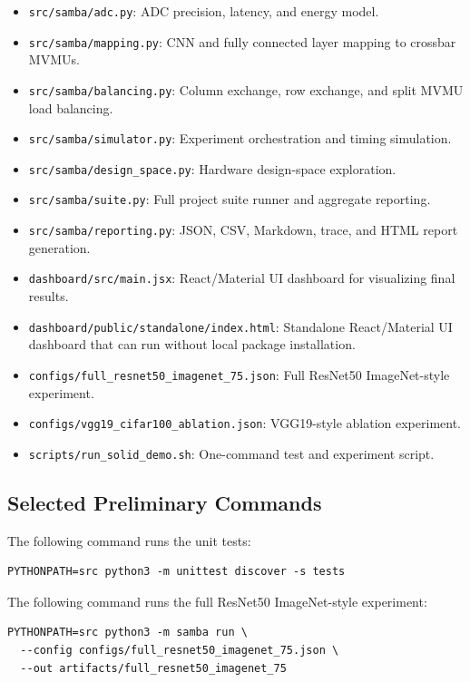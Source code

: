 \documentclass[11pt]{article}
\begin{document}
\begin{itemize}
    \item \texttt{src/samba/adc.py}: ADC precision, latency, and energy model.
    \item \texttt{src/samba/mapping.py}: CNN and fully connected layer mapping to crossbar MVMUs.
    \item \texttt{src/samba/balancing.py}: Column exchange, row exchange, and split MVMU load balancing.
    \item \texttt{src/samba/simulator.py}: Experiment orchestration and timing simulation.
    \item \texttt{src/samba/design\_space.py}: Hardware design-space exploration.
    \item \texttt{src/samba/suite.py}: Full project suite runner and aggregate reporting.
    \item \texttt{src/samba/reporting.py}: JSON, CSV, Markdown, trace, and HTML report generation.
    \item \texttt{dashboard/src/main.jsx}: React/Material UI dashboard for visualizing final results.
    \item \texttt{dashboard/public/standalone/index.html}: Standalone React/Material UI dashboard that can run without local package installation.
    \item \texttt{configs/full\_resnet50\_imagenet\_75.json}: Full ResNet50 ImageNet-style experiment.
    \item \texttt{configs/vgg19\_cifar100\_ablation.json}: VGG19-style ablation experiment.
    \item \texttt{scripts/run\_solid\_demo.sh}: One-command test and experiment script.
\end{itemize}

\subsection{Selected Preliminary Commands}

The following command runs the unit tests:

\begin{lstlisting}
PYTHONPATH=src python3 -m unittest discover -s tests
\end{lstlisting}

The following command runs the full ResNet50 ImageNet-style experiment:

\begin{lstlisting}
PYTHONPATH=src python3 -m samba run \
  --config configs/full_resnet50_imagenet_75.json \
  --out artifacts/full_resnet50_imagenet_75
\end{lstlisting}
\end{document}
